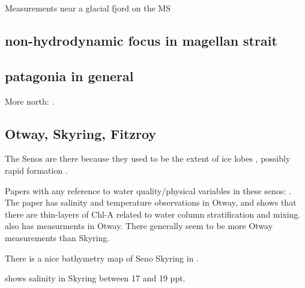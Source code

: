 \documentclass[11pt, oneside]{article}   	%
\begin{document}
Measurements near a glacial fjord on the MS \citep{ValleLevinson2006}


\subsection*{non-hydrodynamic focus in magellan strait}

\citep{talbot1997meps}

\subsection{patagonia in general}

More north: \citep{narvaez19}.

\subsection{Otway, Skyring, Fitzroy}

The Senos are there because they used to be the extent of ice lobes \citep{darvill17}, possibly rapid formation \citep{lovell12}.

Papers with any reference to water quality/physical variables in these senos: \citep{mansilla13, rodriguez18, valdenegro03, rios16, mansilla13_AIP}. The \citet{rios16} paper has salinity and temperature observations in Otway, and shows that there are thin-layers of Chl-A related to water column stratification and mixing. \citep{cuevas19} also has measurments in Otway. There generally seem to be more Otway measurements than Skyring. 

There is a nice bathymetry map of Seno Skyring in \citep{breuer13}.

\citep{kilian07} shows salinity in Skyring between 17 and 19 ppt. 

{}

\end{document}
